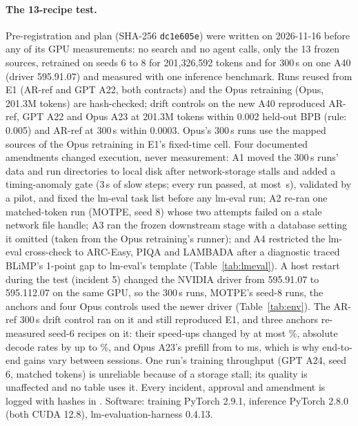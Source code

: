 \documentclass{article}
\begin{document}
\paragraph{The 13-recipe test.} Pre-registration  and plan  (SHA-256 \texttt{dc1e605e}) were written on 2026-11-16 before any of its GPU measurements: no search and no agent calls, only the 13 frozen sources, retrained on seeds 6 to 8 for 201{,}326{,}592 tokens and for 300\,s on one A40 (driver 595.91.07) and measured with one inference benchmark. Runs reused from E1 (AR-ref and GPT A22, both contracts) and the Opus retraining (Opus, 201.3M tokens) are hash-checked; drift controls on the new A40 reproduced AR-ref, GPT A22 and Opus A23 at 201.3M tokens within 0.002 held-out BPB (rule: 0.005) and AR-ref at 300\,s within 0.0003. Opus's 300\,s runs use the mapped sources of the Opus retraining in E1's fixed-time cell. Four documented amendments changed execution, never measurement: A1 moved the 300\,s runs' data and run directories to local disk after network-storage stalls and added a timing-anomaly gate (3\,s of slow steps; every run passed, at most \CRSixFixedMaxExcess\,s), validated by a pilot, and fixed the lm-eval task list before any lm-eval run; A2 re-ran one matched-token run (MOTPE, seed 8) whose two attempts failed on a stale network file handle; A3 ran the frozen downstream stage with a database setting it omitted (taken from the Opus retraining's runner); and A4 restricted the lm-eval cross-check to ARC-Easy, PIQA and LAMBADA after a diagnostic traced BLiMP's 1-point gap to lm-eval's template (Table~\ref{tab:lmeval}). A host restart during the test (incident 5) changed the NVIDIA driver from 595.91.07 to 595.112.07 on the same GPU, so the 300\,s runs, MOTPE's seed-8 runs, the anchors and four Opus controls used the newer driver (Table~\ref{tab:env}). The AR-ref 300\,s drift control ran on it and still reproduced E1, and three anchors re-measured seed-6 recipes on it: their speed-ups changed by at most \CRSixAnchorSpeedMax\%, absolute decode rates by up to \CRSixAnchorDecodeMax\%, and Opus A23's prefill from \CRSixAnchorPreA{} to \CRSixAnchorPreB{} ms, which is why end-to-end gains vary between sessions. One run's training throughput (GPT A24, seed 6, matched tokens) is unreliable because of a storage stall; its quality is unaffected and no table uses it. Every incident, approval and amendment is logged with hashes in . Software: training PyTorch 2.9.1, inference PyTorch 2.8.0 (both CUDA 12.8), lm-evaluation-harness 0.4.13.
\end{document}

